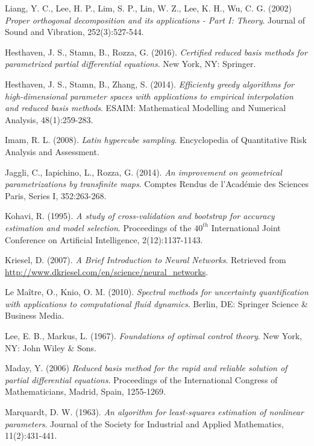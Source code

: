 \documentclass[longtitle]{elsarticle}
\numberwithin{equation}{section}
\theoremstyle{theorem}
\theoremstyle{definition}
\theoremstyle{remark}
\theoremstyle{proposition}
\numberwithin{figure}{section}
\begin{document}
\begin{thebibliography}{50}
		Liang, Y. C., Lee, H. P., Lim, S. P., Lin, W. Z., Lee, K. H., Wu, C. G. (2002) \emph{Proper orthogonal decomposition and its applications - Part I: Theory}. Journal of Sound and Vibration, 252(3):527-544.
		
		Hesthaven, J. S., Stamn, B., Rozza, G. (2016). \emph{Certified reduced basis methods for parametrized partial differential equations}. New York, NY: Springer.
		
		Hesthaven, J. S., Stamn, B., Zhang, S. (2014). \emph{Efficienty greedy algorithms for high-dimensional parameter spaces with applications to empirical interpolation and reduced basis methods}. ESAIM: Mathematical Modelling and Numerical Analysis, 48(1):259-283.
		
		Imam, R. L. (2008). \emph{Latin hypercube sampling}. Encyclopedia of Quantitative Risk Analysis and Assessment.
		
		Jaggli, C., Iapichino, L., Rozza, G. (2014). \emph{An improvement on geometrical parametrizations by transfinite maps}. Comptes Rendus de l'Acad\'emie des Sciences Paris, Series I, 352:263-268. 
				
		Kohavi, R. (1995). \emph{A study of cross-validation and bootstrap for accuracy estimation and model selection}. Proceedings of the $40^{th}$ International Joint Conference on Artificial Intelligence, 2(12):1137-1143.
		
		Kriesel, D. (2007). \emph{A Brief Introduction to Neural Networks}. Retrieved from \url{http://www.dkriesel.com/en/science/neural_networks}.
		
		Le Ma\^{i}tre, O., Knio, O. M. (2010). \emph{Spectral methods for uncertainty quantification with applications to computational fluid dynamics}. Berlin, DE: Springer Science \& Business Media.
		
		Lee, E. B., Markus, L. (1967). \emph{Foundations of optimal control theory}. New York, NY: John Wiley \& Sons.
		
		Maday, Y. (2006) \emph{Reduced basis method for the rapid and reliable solution of partial differential equations}. Proceedings of the International Congress of Mathematicians, Madrid, Spain, 1255-1269.
		
		Marquardt, D. W. (1963). \emph{An algorithm for least-squares estimation of nonlinear parameters}. Journal of the Society for Industrial and Applied Mathematics, 11(2):431-441.
		

\end{thebibliography}
\end{document}
